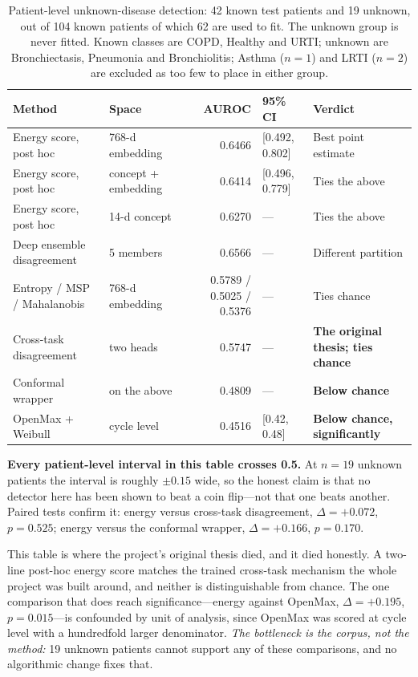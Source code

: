\documentclass[journal,onecolumn]{IEEEtran}
\newcommand{\best}[1]{\textbf{#1}}
\begin{document}
\begin{table}[!t]
\centering
\caption{Patient-level unknown-disease detection: 42 known test patients and 19
unknown, out of 104 known patients of which 62 are used to fit. The unknown group
is never fitted. Known classes are COPD, Healthy and URTI; unknown are
Bronchiectasis, Pneumonia and Bronchiolitis; Asthma ($n=1$) and LRTI ($n=2$) are
excluded as too few to place in either group.}
\label{tab:openset}
\small
\begin{tabular}{llrll}
\toprule
Method & Space & AUROC & 95\% CI & Verdict \\
\midrule
Energy score, post hoc         & 768-d embedding & 0.6466 & [0.492, 0.802] & Best point estimate \\
Energy score, post hoc         & concept + embedding & 0.6414 & [0.496, 0.779] & Ties the above \\
Energy score, post hoc         & 14-d concept & 0.6270 & --- & Ties the above \\
Deep ensemble disagreement     & 5 members & 0.6566 & --- & Different partition \\
Entropy / MSP / Mahalanobis    & 768-d embedding & 0.5789 / 0.5025 / 0.5376 & --- & Ties chance \\
Cross-task disagreement        & two heads & 0.5747 & --- & \best{The original thesis; ties chance} \\
Conformal wrapper              & on the above & 0.4809 & --- & \best{Below chance} \\
OpenMax + Weibull              & cycle level & 0.4516 & [0.42, 0.48] & \best{Below chance, significantly} \\
\bottomrule
\end{tabular}

\vspace{2pt}
\footnotesize \textbf{Every patient-level interval in this table crosses 0.5.} At
$n=19$ unknown patients the interval is roughly $\pm0.15$ wide, so the honest claim
is that no detector here has been shown to beat a coin flip---not that one beats
another. Paired tests confirm it: energy versus cross-task disagreement,
$\Delta = +0.072$, $p = 0.525$; energy versus the conformal wrapper,
$\Delta = +0.166$, $p = 0.170$.
\end{table}

This table is where the project's original thesis died, and it died honestly. A
two-line post-hoc energy score matches the trained cross-task mechanism the whole
project was built around, and neither is distinguishable from chance. The one
comparison that does reach significance---energy against OpenMax,
$\Delta = +0.195$, $p = 0.015$---is confounded by unit of analysis, since OpenMax
was scored at cycle level with a hundredfold larger denominator. \emph{The
bottleneck is the corpus, not the method:} 19 unknown patients cannot support any
of these comparisons, and no algorithmic change fixes that.
\end{document}
